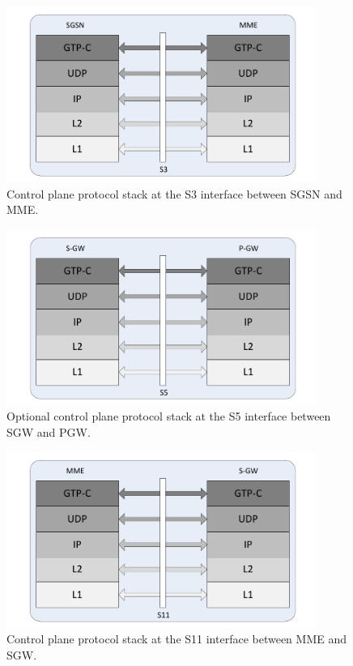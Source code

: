 \begin{figure}[htbp]
	 \centering
	 \includegraphics[width=0.9\textwidth]{images/SGSN-MME-layers.pdf}
	 \caption{Control plane protocol stack at the S3 interface between SGSN and MME.}
	 \label{c4:fig:stack-sgsnmme}
\end{figure}

\begin{figure}[htbp]
	\centering
	\includegraphics[width=0.9\textwidth]{images/S-GW-P-GW-layers.pdf}
	\caption{Optional control plane protocol stack at the S5 interface between SGW and PGW.}
	\label{c4:fig:stack-sgwpgw}
\end{figure}

\begin{figure}[htbp]
	\centering
	\includegraphics[width=0.9\textwidth]{images/MME-S-GW-layers.pdf}
	\caption{Control plane protocol stack at the S11 interface between MME and SGW.}
	\label{c4:fig:stack-mmesgw}
\end{figure}


